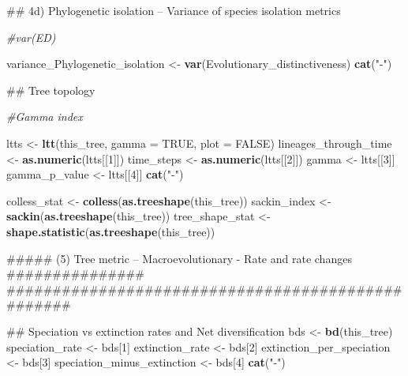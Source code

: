 \documentclass[]{book}
\newenvironment{Shaded}{\begin{snugshade}}{\end{snugshade}}
\newcommand{\KeywordTok}[1]{\textcolor[rgb]{0.13,0.29,0.53}{\textbf{{#1}}}}
\newcommand{\DataTypeTok}[1]{\textcolor[rgb]{0.13,0.29,0.53}{{#1}}}
\newcommand{\DecValTok}[1]{\textcolor[rgb]{0.00,0.00,0.81}{{#1}}}
\newcommand{\StringTok}[1]{\textcolor[rgb]{0.31,0.60,0.02}{{#1}}}
\newcommand{\CommentTok}[1]{\textcolor[rgb]{0.56,0.35,0.01}{\textit{{#1}}}}
\newcommand{\OtherTok}[1]{\textcolor[rgb]{0.56,0.35,0.01}{{#1}}}
\newcommand{\NormalTok}[1]{{#1}}
\theoremstyle{definition}
\theoremstyle{definition}
\theoremstyle{definition}
\theoremstyle{remark}
\begin{document}
\begin{Shaded}
\begin{Highlighting}[]
{\NormalTok{    ## 4d) Phylogenetic isolation -- Variance of species isolation metrics}

    \CommentTok{#var(ED)}

\NormalTok{    variance_Phylogenetic_isolation <-}\StringTok{ }\KeywordTok{var}\NormalTok{(Evolutionary_distinctiveness)}
    \KeywordTok{cat}\NormalTok{(}\StringTok{"-"}\NormalTok{)}

\NormalTok{    ## Tree topology}

    \CommentTok{#Gamma index}

\NormalTok{    ltts <-}\StringTok{ }\KeywordTok{ltt}\NormalTok{(this_tree, }\DataTypeTok{gamma =} \OtherTok{TRUE}\NormalTok{, }\DataTypeTok{plot =} \OtherTok{FALSE}\NormalTok{)}
\NormalTok{    lineages_through_time <-}\StringTok{ }\KeywordTok{as.numeric}\NormalTok{(ltts[[}\DecValTok{1}\NormalTok{]])}
\NormalTok{    time_steps <-}\StringTok{ }\KeywordTok{as.numeric}\NormalTok{(ltts[[}\DecValTok{2}\NormalTok{]])}
\NormalTok{    gamma <-}\StringTok{ }\NormalTok{ltts[[}\DecValTok{3}\NormalTok{]]}
\NormalTok{    gamma_p_value <-}\StringTok{ }\NormalTok{ltts[[}\DecValTok{4}\NormalTok{]]}
    \KeywordTok{cat}\NormalTok{(}\StringTok{"-"}\NormalTok{)}

\NormalTok{    colless_stat <-}\StringTok{ }\KeywordTok{colless}\NormalTok{(}\KeywordTok{as.treeshape}\NormalTok{(this_tree))}
\NormalTok{    sackin_index <-}\StringTok{ }\KeywordTok{sackin}\NormalTok{(}\KeywordTok{as.treeshape}\NormalTok{(this_tree))}
\NormalTok{    tree_shape_stat <-}\StringTok{ }\KeywordTok{shape.statistic}\NormalTok{(}\KeywordTok{as.treeshape}\NormalTok{(this_tree))}

\NormalTok{    ##### (5) Tree metric -- Macroevolutionary - Rate and rate changes ###############}
\NormalTok{    ##################################################}

\NormalTok{    ## Speciation vs extinction rates and Net diversification}
\NormalTok{    bds <-}\StringTok{ }\KeywordTok{bd}\NormalTok{(this_tree)}
\NormalTok{    speciation_rate <-}\StringTok{ }\NormalTok{bds[}\DecValTok{1}\NormalTok{]}
\NormalTok{    extinction_rate <-}\StringTok{ }\NormalTok{bds[}\DecValTok{2}\NormalTok{]}
\NormalTok{    extinction_per_speciation <-}\StringTok{ }\NormalTok{bds[}\DecValTok{3}\NormalTok{]}
\NormalTok{    speciation_minus_extinction <-}\StringTok{ }\NormalTok{bds[}\DecValTok{4}\NormalTok{]}
    \KeywordTok{cat}\NormalTok{(}\StringTok{"-"}\NormalTok{)}

}
\end{Highlighting}
\end{Shaded}
\end{document}
